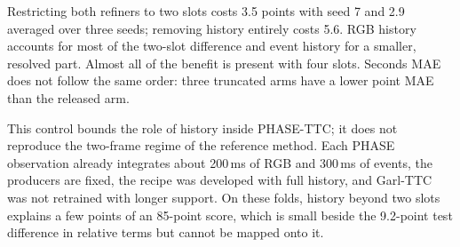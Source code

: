 \begin{table}[htbp]
\centering\small
\caption{Fusion-head Overall MiD on TRAIN40 development folds as a function of the history available to the context refiners; seed-7 levels, with paired sequence-bootstrap differences against the released arm.}
\label{tab:post-audit-history}
\end{table}

Restricting both refiners to two slots costs 3.5 points with seed 7 and 2.9 averaged over three seeds; removing history entirely costs 5.6. RGB history accounts for most of the two-slot difference and event history for a smaller, resolved part. Almost all of the benefit is present with four slots. Seconds MAE does not follow the same order: three truncated arms have a lower point MAE than the released arm.

This control bounds the role of history inside PHASE-TTC; it does not reproduce the two-frame regime of the reference method. Each PHASE observation already integrates about 200\,ms of RGB and 300\,ms of events, the producers are fixed, the recipe was developed with full history, and Garl-TTC was not retrained with longer support. On these folds, history beyond two slots explains a few points of an 85-point score, which is small beside the 9.2-point test difference in relative terms but cannot be mapped onto it.
